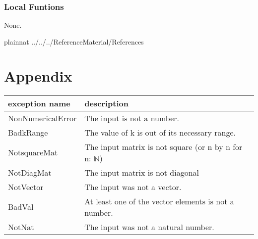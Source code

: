 \documentclass[12pt, titlepage]{article}
\begin{document}
\subsubsection{Local Funtions} 

None. 

\newpage 


 {plainnat}
 {../../../ReferenceMaterial/References}

\newpage

\section{Appendix} \label{Appendix}

\renewcommand{\arraystretch}{1.2}
\begin{tabular}{l l} 
	\toprule		
	\textbf{exception name} & \textbf{description}\\
	\midrule 
	NonNumericalError & The input is not a number.\\ 
	BadkRange & The value of k is out of its necessary range.\\ 
	NotsquareMat & The input matrix is not square (or n by n for n: 
	$\mathbb{N}$)\\ 
	NotDiagMat & The input matrix is not diagonal \\ 
	NotVector & The input was not a vector. \\ 
	BadVal & At least one of the vector elements is not a number. \\ 
	NotNat & The input was not a natural number. \\
	\bottomrule
\end{tabular}\\
\end{document}

